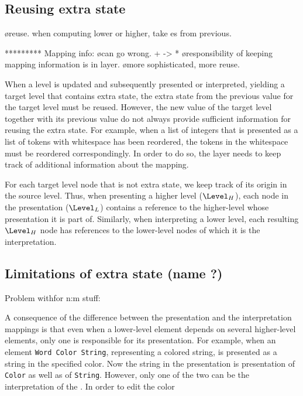 \subsection{Reusing extra state}

\bl
\o reuse. when computing lower or higher, take es from previous.
\el

********* Mapping info:
\bl
\o can go wrong. + -> *
\el
\bl
\o responsibility of keeping mapping information is in layer.
\o more sophisticated, more reuse.
\el

When a level is updated and subsequently presented or interpreted, yielding a target level that contains extra state, the extra state from the previous value for the target level must be reused. However, the new value of the target level together with its previous value do not always provide sufficient information for reusing the extra state. For example, when a list of integers that is presented as a list of tokens with whitespace has been reordered, the tokens in the whitespace must be reordered correspondingly.  In order to do so, the layer needs to keep track of additional information about the mapping.

For each target level node that is not extra state, we keep track of its origin in the source level. Thus, when presenting a higher level ($\Level_{H}$), each node in the presentation ($\Level_{L}$) contains a reference to the higher-level whose presentation it is part of. Similarly, when interpreting a lower level, each resulting $\Level_{H}$ node has references to the lower-level nodes of which it is the interpretation. 

\subsection{Limitations of extra state (name ?)}

Problem withfor n:m stuff:

\bc
A consequence of the difference between the presentation and the interpretation mappings is that even when a lower-level element depends on several higher-level elements, only one is responsible for its presentation. For example, when an element \verb|Word Color String|, representing a colored string, is presented as a string in the specified color. Now the string in the presentation is presentation of \verb|Color| as well as of \verb|String|. However, only one of the two can be the interpretation of the . In order to edit the color
\ec

